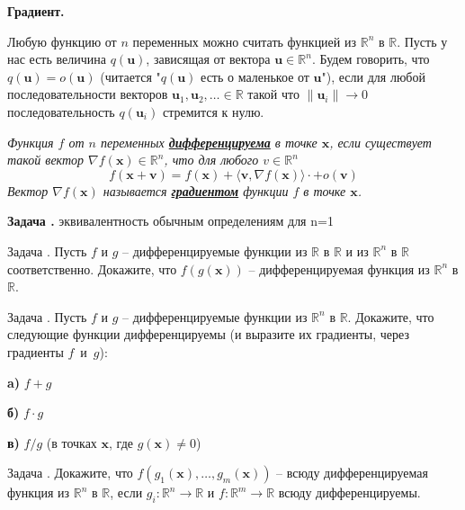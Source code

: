 \documentclass[12pt,a4paper]{article}
\def\R{\mathbb{R}}
\newcounter{znum}
\newcommand{\zz}[1]{\addtocounter{znum}{1} \textbf{Задача \arabic{znum}#1. }}
\newcommand{\z}[1]{\addtocounter{znum}{1} Задача \arabic{znum}#1. }
\begin{document}
\pagestyle{empty}

\begin{center} \Large \textbf{Градиент.}
\end{center}

Любую функцию от $n$ переменных можно считать функцией из $\R^n$ в $\R$. 
Пусть у нас есть величина $q(\mathbf{u})$, зависящая от вектора $\mathbf{u} \in \R^n$. Будем говорить, что $q(\mathbf{u}) = o(\mathbf{u})$ (читается "$q(\mathbf{u})$ есть о маленькое от $\mathbf{u}$"), если для любой последовательности векторов $\mathbf{u}_1, \mathbf{u}_2, \ldots \in \R$ такой что $\|\mathbf{u}_i\| \to 0$ последовательность $q(\mathbf{u}_i)$ стремится к нулю.


{\it Функция $f$ от $n$ переменных \textbf{\href{https://ru.wikipedia.org/wiki/\%D0\%94\%D0\%B8\%D1\%84\%D1\%84\%D0\%B5\%D1\%80\%D0\%B5\%D0\%BD\%D1\%86\%D0\%B8\%D1\%80\%D1\%83\%D0\%B5\%D0\%BC\%D0\%B0\%D1\%8F_\%D1\%84\%D1\%83\%D0\%BD\%D0\%BA\%D1\%86\%D0\%B8\%D1\%8F\#\%D0\%A4\%D1\%83\%D0\%BD\%D0\%BA\%D1\%86\%D0\%B8\%D0\%B8_\%D0\%BD\%D0\%B5\%D1\%81\%D0\%BA\%D0\%BE\%D0\%BB\%D1\%8C\%D0\%BA\%D0\%B8\%D1\%85_\%D0\%BF\%D0\%B5\%D1\%80\%D0\%B5\%D0\%BC\%D0\%B5\%D0\%BD\%D0\%BD\%D1\%8B\%D1\%85}{дифференцируема}} в точке $\mathbf{x}$, если существует такой вектор $\nabla f(\mathbf{x}) \in \R^n$, что для любого $v \in \R^n$
$$ f(\mathbf{x} + \mathbf{v}) = f(\mathbf{x}) + \langle \mathbf{v}, \nabla f(\mathbf{x}) \rangle \cdot + o(\mathbf{v})$$
Вектор $\nabla f(\mathbf{x})$ называется \textbf{\href{https://ru.wikipedia.org/wiki/\%D0\%93\%D1\%80\%D0\%B0\%D0\%B4\%D0\%B8\%D0\%B5\%D0\%BD\%D1\%82}{градиентом}} функции $f$ в точке $\mathbf{x}$.
}

\zz{} эквивалентность обычным определениям для n=1

\z{} Пусть $f$ и $g$ -- дифференцируемые функции из $\R$ в $\R$ и из $\R^n$ в $\R$ соответственно. Докажите, что $f(g(\mathbf{x}))$ -- дифференцируемая функция из $\R^n$  в $\R$.

\z{} Пусть $f$ и $g$ -- дифференцируемые функции из $\R^n$ в $\R$. Докажите, что следующие функции дифференцируемы (и выразите их градиенты, через градиенты $f$~и~$g$):\par
\textbf{a)} $f + g$ \par
\textbf{б)} $f \cdot g$ \par
\textbf{в)} $f / g$ (в точках $\mathbf{x}$, где $g(\mathbf{x}) \ne 0$)

\z{} Докажите, что $f(g_1(\mathbf{x}), \ldots, g_m(\mathbf{x}))$ -- всюду дифференцируемая функция из $\R^n$ в $\R$, если $g_i: \R^n \to \R$ и $f: \R^m \to \R$ всюду дифференцируемы.
\end{document}
